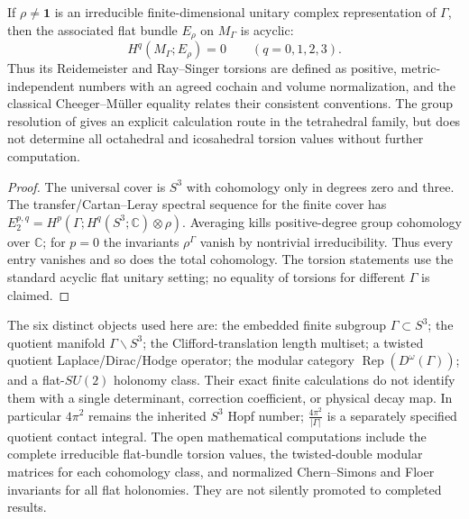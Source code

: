 \documentclass[11pt]{article}
\begin{document}
\begin{proposition}
\label{p1b:prop:v14-acyclic-flat-torsion}
If $\rho\ne\mathbf1$ is an irreducible finite-dimensional unitary
complex representation of $\Gamma$, then the associated flat bundle
$E_\rho$ on $M_\Gamma$ is acyclic:
\[
 H^q(M_\Gamma;E_\rho)=0\qquad(q=0,1,2,3).
\]
Thus its Reidemeister and Ray--Singer torsions are defined as positive,
metric-independent numbers with an agreed cochain and volume
normalization, and the classical Cheeger--M\"uller equality relates
their consistent conventions. The group resolution of
\cite{ChiriviSpreafico2018} gives an explicit calculation route in the
tetrahedral family, but does not determine all octahedral and
icosahedral torsion values without further computation.
\end{proposition}
\begin{proof}
The universal cover is $S^3$ with cohomology only in degrees zero
and three. The transfer/Cartan--Leray spectral sequence for the finite
cover has $E_2^{p,q}=H^p(\Gamma;H^q(S^3;\mathbb C)\otimes\rho)$.
Averaging kills positive-degree group cohomology over $\mathbb C$;
for $p=0$ the invariants $\rho^\Gamma$ vanish by nontrivial
irreducibility. Thus every entry vanishes and so does the total
cohomology.  The torsion statements use the standard acyclic flat
unitary setting; no equality of torsions for different $\Gamma$ is
claimed.
\end{proof}

\begin{remark}
\label{p1b:rem:v14-observable-and-research-scope}
The six distinct objects used here are: the embedded finite subgroup
$\Gamma\subset S^3$; the quotient manifold $\Gamma\backslash S^3$;
the Clifford-translation length multiset; a twisted quotient
Laplace/Dirac/Hodge operator; the modular category
$\operatorname{Rep}(D^\omega(\Gamma))$; and a flat-$SU(2)$ holonomy
class. Their exact finite calculations do not identify them with a
single determinant, correction coefficient, or physical decay map.
In particular $4\pi^2$ remains the inherited $S^3$ Hopf number;
$\frac{4\pi^2}{|\Gamma|}$ is a separately specified quotient contact
integral.  The open mathematical computations include the complete
irreducible flat-bundle torsion values, the twisted-double modular
matrices for each cohomology class, and normalized Chern--Simons and
Floer invariants for all flat holonomies. They are not silently
promoted to completed results.
\end{remark}
\end{document}
